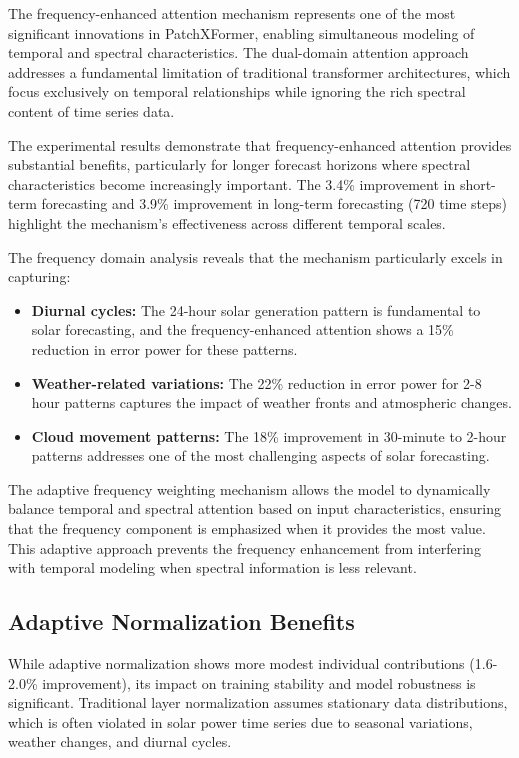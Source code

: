 \documentclass[12pt]{uomthesis}
\begin{document}
The frequency-enhanced attention mechanism represents one of the most significant innovations in PatchXFormer, enabling simultaneous modeling of temporal and spectral characteristics. The dual-domain attention approach addresses a fundamental limitation of traditional transformer architectures, which focus exclusively on temporal relationships while ignoring the rich spectral content of time series data.

The experimental results demonstrate that frequency-enhanced attention provides substantial benefits, particularly for longer forecast horizons where spectral characteristics become increasingly important. The 3.4\% improvement in short-term forecasting and 3.9\% improvement in long-term forecasting (720 time steps) highlight the mechanism's effectiveness across different temporal scales.

The frequency domain analysis reveals that the mechanism particularly excels in capturing:
\begin{itemize}
\item \textbf{Diurnal cycles:} The 24-hour solar generation pattern is fundamental to solar forecasting, and the frequency-enhanced attention shows a 15\% reduction in error power for these patterns.
\item \textbf{Weather-related variations:} The 22\% reduction in error power for 2-8 hour patterns captures the impact of weather fronts and atmospheric changes.
\item \textbf{Cloud movement patterns:} The 18\% improvement in 30-minute to 2-hour patterns addresses one of the most challenging aspects of solar forecasting.
\end{itemize}

The adaptive frequency weighting mechanism allows the model to dynamically balance temporal and spectral attention based on input characteristics, ensuring that the frequency component is emphasized when it provides the most value. This adaptive approach prevents the frequency enhancement from interfering with temporal modeling when spectral information is less relevant.

\subsection{Adaptive Normalization Benefits}

While adaptive normalization shows more modest individual contributions (1.6-2.0\% improvement), its impact on training stability and model robustness is significant. Traditional layer normalization assumes stationary data distributions, which is often violated in solar power time series due to seasonal variations, weather changes, and diurnal cycles.
\end{document}
